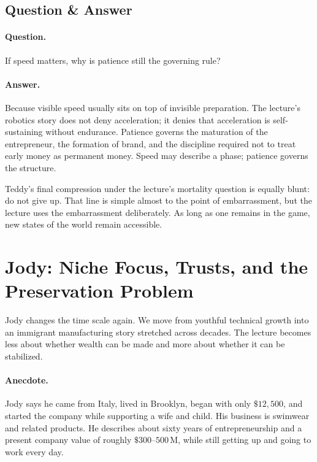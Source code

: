\subsection{Question \& Answer}

\paragraph{Question.}
If speed matters, why is patience still the governing rule?

\paragraph{Answer.}
Because visible speed usually sits on top of invisible preparation. The lecture's robotics story does not deny acceleration; it denies that acceleration is self-sustaining without endurance. Patience governs the maturation of the entrepreneur, the formation of brand, and the discipline required not to treat early money as permanent money. Speed may describe a phase; patience governs the structure.

Teddy's final compression under the lecture's mortality question is equally blunt: do not give up. That line is simple almost to the point of embarrassment, but the lecture uses the embarrassment deliberately. As long as one remains in the game, new states of the world remain accessible.

\section{Jody: Niche Focus, Trusts, and the Preservation Problem}

Jody changes the time scale again. We move from youthful technical growth into an immigrant manufacturing story stretched across decades. The lecture becomes less about whether wealth can be made and more about whether it can be stabilized.

\paragraph{Anecdote.}
Jody says he came from Italy, lived in Brooklyn, began with only \(\$12{,}500\), and started the company while supporting a wife and child. His business is swimwear and related products. He describes about sixty years of entrepreneurship and a present company value of roughly \(\$300\text{--}500\,\mathrm{M}\), while still getting up and going to work every day.

